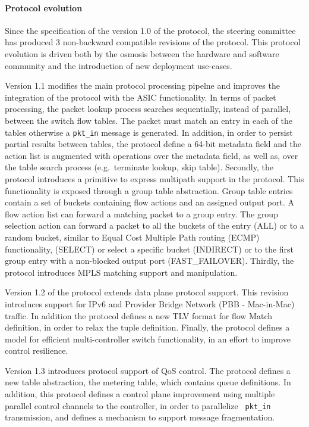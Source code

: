 \paragraph{Protocol evolution} 

Since the specification of the version 1.0 of the protocol, the \of steering
committee has produced 3 non-backward compatible revisions of the protocol. This
protocol evolution is driven both by the osmosis between the hardware and
software \of community and the introduction of new deployment use-cases. 

Version 1.1  modifies the main protocol processing pipelne and improves the
integration of the protocol with the ASIC functionality. In terms of packet
processing, the packet lookup process searches sequentially, instead of
parallel, between the switch flow tables.  The packet must match an entry in
each of the tables otherwise a {\tt pkt\_in} message is generated. In addition,
in order to persist partial results between tables, the protocol define a 64-bit
metadata field and the action list is augmented with operations over the
metadata field, as well as, over the table search process (e.g.~terminate
lookup, skip table).   Secondly, the protocol introduces a
primitive to express multipath support in the protocol. This functionality is
exposed through a group table abstraction.  Group table entries contain a set of
buckets containing flow actions and an assigned output port. A flow action list
can forward a matching packet to a group entry. The group selection action can
forward a packet to all the buckets of the entry (ALL) or to a random bucket,
similar to Equal Cost Multiple Path routing (ECMP)~\cite{RFC2992} functionality,
(SELECT) or select a specific bucket (INDIRECT) or to the first group entry with
a non-blocked output port (FAST\_FAILOVER).  Thirdly, the protocol introduces
MPLS matching support and manipulation.

Version 1.2 of the protocol extends data plane protocol support. This revision
introduces support for IPv6 and Provider Bridge Network (PBB - Mac-in-Mac)
traffic. In addition the protocol defines a new TLV format for flow Match
definition, in order to relax the \of tuple definition.  Finally, the protocol
defines a model for efficient multi-controller switch functionality, in an
effort to improve control resilience.


Version 1.3 introduces protocol support of QoS control. The protocol defines a
new table abstraction, the metering table, which contains queue definitions. In
addition, this protocol defines a control plane improvement using multiple
parallel control channels to the controller, in order to parallelize {\tt
  pkt\_in} transmission, and defines a mechanism to support message
fragmentation.  

